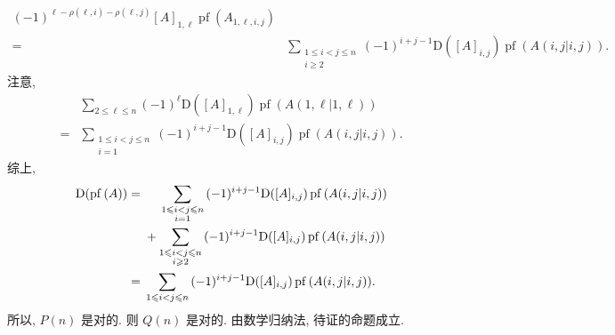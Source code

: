 \documentclass[../libro.tex]{subfiles}
\begin{document}
\begin{example}
\begin{align*}
        (-1)^{\ell-\rho(\ell, i)-\rho(\ell, j)} [A]_{1,\ell}
        \operatorname{pf} {(A_{1,\ell,i,j})}
        \\
        = {} &
        \sum_{\substack{1 \leq i < j \leq n \\ i \geq 2}}
        {
            (-1)^{i+j-1} \mathrm{D} ([A]_{i,j})
            \operatorname{pf} {(A({i,j}|{i,j}))}
        }.
    \end{align*}
    注意,
    \begin{align*}
        &
        \sum_{2 \leq \ell \leq n}
        {(-1)^{\ell}
            \mathrm{D} ([A]_{1,\ell})
            \operatorname{pf} {(A({1,\ell}|{1,\ell}))}
        }
        \\
        = {} &
        \sum_{\substack{1 \leq i < j \leq n \\ i = 1}}
        {
            (-1)^{i+j-1} \mathrm{D} ([A]_{i,j})
            \operatorname{pf} {(A({i,j}|{i,j}))}
        }.
    \end{align*}
    综上,
    \begin{align*}
        \mathrm{D} (\operatorname{pf} {(A)})
        = {} &
        \hphantom{{} + {}}
        \sum_{\substack{1 \leq i < j \leq n \\ i = 1}}
        {
            (-1)^{i+j-1} \mathrm{D} ([A]_{i,j})
            \operatorname{pf} {(A({i,j}|{i,j}))}
        }
        \\
        &
        +
        \sum_{\substack{1 \leq i < j \leq n \\ i \geq 2}}
        {
            (-1)^{i+j-1} \mathrm{D} ([A]_{i,j})
            \operatorname{pf} {(A({i,j}|{i,j}))}
        }
        \\
        = {} &
        \sum_{1 \leq i < j \leq n}
        {(-1)^{i+j-1} \mathrm{D} ([A]_{i,j})
        \operatorname{pf} {(A({i,j}|{i,j}))}}.
    \end{align*}
    所以, \(P(n)\) 是对的.
    则 \(Q(n)\) 是对的.
    由数学归纳法, 待证的命题成立.
\end{example}
\end{document}
